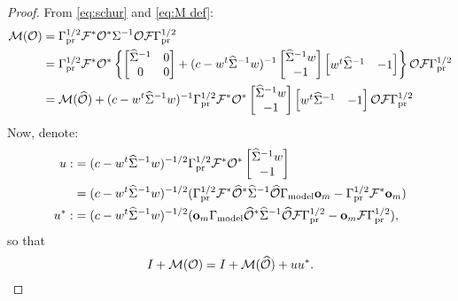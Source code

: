 \documentclass{article}
\begin{document}
\begin{proof}
  From \eqref{eq:schur} and \eqref{eq:M def}:
  \begin{align*}
    \mathcal{M}(\mathcal{O}) &= \Gamma_{\textup{pr}}^{1/2} \mathcal{F}^* \mathcal{O}^* \Sigma^{-1} \mathcal{O} \mathcal{F} \Gamma_{\textup{pr}}^{1/2} \\
    &= \Gamma_{\textup{pr}}^{1/2} \mathcal{F}^* \mathcal{O}^* \left \{
    \begin{bmatrix}
      \widehat{\Sigma}^{-1} & 0 \\
      0           & 0 
    \end{bmatrix}
    + (c -w^t \widehat{\Sigma}^{-1} w )^{-1}
    \begin{bmatrix}
      \widehat{\Sigma}^{-1} w \\
      -1
    \end{bmatrix}
    \begin{bmatrix}
      w^t \widehat{\Sigma}^{-1} & -1 
    \end{bmatrix} 
    \right \} \mathcal{O} \mathcal{F} \Gamma_{\textup{pr}}^{1/2} \\
    &= \mathcal{M} (\widehat{\mathcal{O}}) + (c -w^t \widehat{\Sigma}^{-1} w )^{-1}
    \Gamma_{\textup{pr}}^{1/2} \mathcal{F}^* \mathcal{O}^*
    \begin{bmatrix}
      \widehat{\Sigma}^{-1} w \\
      -1
    \end{bmatrix}
    \begin{bmatrix}
      w^t \widehat{\Sigma}^{-1} & -1 
    \end{bmatrix} 
    \mathcal{O} \mathcal{F} \Gamma_{\textup{pr}}^{1/2}
  \end{align*}
  Now, denote:
  \begin{align}\label{eq:u}
    \begin{split}
      u :&= (c -w^t \widehat{\Sigma}^{-1} w )^{-1/2}
      \Gamma_{\textup{pr}}^{1/2} \mathcal{F}^* \mathcal{O}^* 
      \begin{bmatrix}
        \widehat{\Sigma}^{-1} w \\
        -1 
      \end{bmatrix} \\
      & = (c -w^t \widehat{\Sigma}^{-1} w )^{-1/2} ( \Gamma_{\textup{pr}}^{1/2}\mathcal{F}^* \widehat{\mathcal{O}}^* \widehat{\Sigma}^{-1} \widehat{\mathcal{O}}  \Gamma_{\textup{model}} \mathbf{o}_m - \Gamma_{\textup{pr}}^{1/2} \mathcal{F}^* \mathbf{o}_m )\\
      u^* :&=  (c -w^t \widehat{\Sigma}^{-1} w )^{-1/2} (\mathbf{o}_m \Gamma_{\textup{model}} \widehat{\mathcal{O}}^* \widehat{\Sigma}^{-1} \widehat{\mathcal{O}} \mathcal{F} \Gamma_{\textup{pr}}^{1/2} - \mathbf{o}_m \mathcal{F} \Gamma_{\textup{pr}}^{1/2} ),
    \end{split}
  \end{align}
  so that
  \begin{equation}\label{eq:M plus I}
    I + \mathcal{M}( \mathcal{O} ) = I + \mathcal{M} (\widehat{\mathcal{O}} ) + uu^*.
  \end{equation}

\end{proof}
\end{document}

